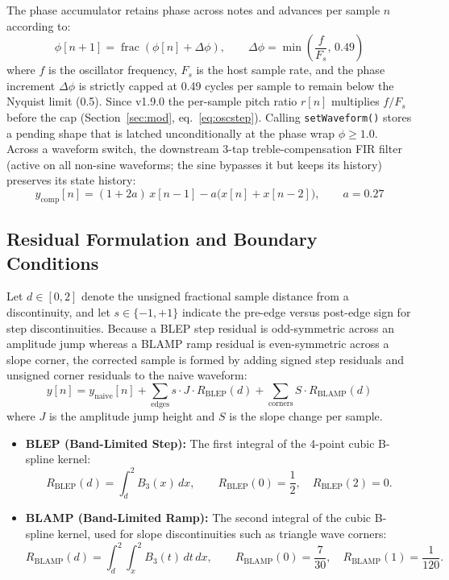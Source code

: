 \documentclass[11pt,letterpaper]{article}
\newcommand{\code}[1]{\texttt{\textcolor{codegray}{#1}}}
\newcommand{\Fs}{F_s}
\newcommand{\frc}{\operatorname{frac}}
\begin{document}
The phase accumulator retains phase across notes and advances per sample $n$ according to:
\begin{equation}\label{eq:phase}
  \phi[n+1] = \frc\!\left(\phi[n] + \Delta\phi\right), \qquad \Delta\phi = \min\!\left(\frac{f}{\Fs},\, 0.49\right)
\end{equation}
where $f$ is the oscillator frequency, $\Fs$ is the host sample rate, and the phase increment $\Delta\phi$ is strictly capped at
0.49 cycles per sample to remain below the Nyquist limit (0.5). Since v1.9.0 the per-sample pitch ratio $r[n]$
multiplies $f/\Fs$ before the cap (Section~\ref{sec:mod}, eq.~\eqref{eq:oscstep}). Calling \code{setWaveform()} stores a pending
shape that is latched unconditionally at the phase wrap $\phi \ge 1.0$. Across a waveform switch, the downstream 3-tap
treble-compensation FIR filter (active on all non-sine waveforms; the sine bypasses it but keeps its history) preserves its state history:
\begin{equation}\label{eq:treble}
  y_{\mathrm{comp}}[n] = (1+2a)\,x[n-1] - a\bigl(x[n] + x[n-2]\bigr), \qquad a = 0.27
\end{equation}

\subsection{Residual Formulation and Boundary Conditions}

Let $d \in [0,2]$ denote the unsigned fractional sample distance from a discontinuity, and let $s \in \{-1,+1\}$ indicate the
pre-edge versus post-edge sign for step discontinuities. Because a BLEP step residual is odd-symmetric across an
amplitude jump whereas a BLAMP ramp residual is even-symmetric across a slope corner, the corrected sample is
formed by adding signed step residuals and unsigned corner residuals to the naive waveform:
\begin{equation}\label{eq:residuals}
  y[n] = y_{\mathrm{naive}}[n] + \sum_{\text{edges}} s \cdot J \cdot R_{\mathrm{BLEP}}(d) + \sum_{\text{corners}} S \cdot R_{\mathrm{BLAMP}}(d)
\end{equation}
where $J$ is the amplitude jump height and $S$ is the slope change per sample.
\begin{itemize}[leftmargin=1.6em, itemsep=2pt, topsep=4pt]
  \item \textbf{BLEP (Band-Limited Step):} The first integral of the 4-point cubic B-spline kernel:
  \begin{equation}\label{eq:blep}
    R_{\mathrm{BLEP}}(d) = \int_d^2 B_3(x)\,dx, \qquad R_{\mathrm{BLEP}}(0) = \frac{1}{2}, \quad R_{\mathrm{BLEP}}(2) = 0.
  \end{equation}
  \item \textbf{BLAMP (Band-Limited Ramp):} The second integral of the cubic B-spline kernel, used for slope discontinuities
  such as triangle wave corners:
  \begin{equation}\label{eq:blamp}
    R_{\mathrm{BLAMP}}(d) = \int_d^2\!\!\int_x^2 B_3(t)\,dt\,dx, \qquad R_{\mathrm{BLAMP}}(0) = \frac{7}{30}, \quad R_{\mathrm{BLAMP}}(1) = \frac{1}{120}.
  \end{equation}
\end{itemize}
\end{document}
